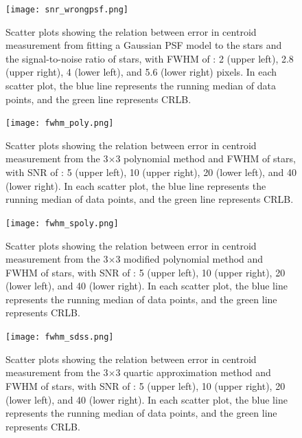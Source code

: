 \documentclass[12pt, preprint]{aastex}
\begin{document}
\begin{figure}[!htb]
  \texttt{[image: snr\_wrongpsf.png]}
\endminipage
\caption{Scatter plots showing the relation between error in centroid
measurement from fitting a Gaussian PSF model to the stars and the signal-to-noise
ratio of stars, with FWHM of : 2 (upper left), 2.8 (upper right), 4 (lower left),
and 5.6 (lower right) pixels. In each scatter plot, the blue line represents the
running median of data points, and the green line represents CRLB.}\label{6}
\end{figure}

\begin{figure}[!htb]
  \texttt{[image: fwhm\_poly.png]}
\endminipage
\caption{Scatter plots showing the relation between error in centroid measurement
from the 3$\times$3 polynomial method and FWHM of stars, with SNR  of : 5 (upper left),
10 (upper right), 20 (lower left), and 40 (lower right). In each scatter plot, the blue
line represents the running median of data points, and the green line represents CRLB.}\label{7}
\end{figure}

\begin{figure}[!htb]
  \texttt{[image: fwhm\_spoly.png]}
\endminipage
\caption{Scatter plots showing the relation between error in centroid measurement
from the 3$\times$3 modified polynomial method and FWHM of stars, with SNR  of 
: 5 (upper left), 10 (upper right), 20 (lower left), and 40 (lower right). In each
scatter plot, the blue line represents the running median of data points, and the
green line represents CRLB.}\label{8}
\end{figure}

\begin{figure}[!htb]
  \texttt{[image: fwhm\_sdss.png]}
\endminipage
\caption{Scatter plots showing the relation between error in centroid measurement from
the 3$\times$3 quartic approximation method and FWHM of stars, with SNR  of : 5 (upper left),
10 (upper right), 20 (lower left), and 40 (lower right). In each scatter plot, the blue line
represents the running median of data points, and the green line represents CRLB.}\label{9}
\end{figure}
\end{document}
